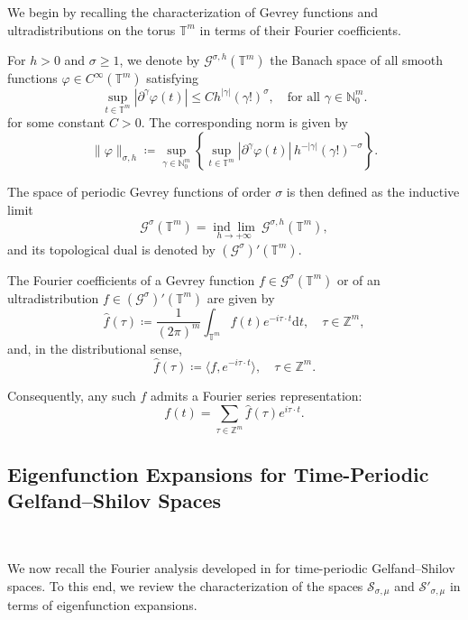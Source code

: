 \documentclass[12pt,reqno]{amsart}
\theoremstyle{definition}
\numberwithin{equation}{section}
\begin{document}
We begin by recalling the characterization of Gevrey functions and ultradistributions on the torus $\mathbb{T}^m$ in terms of their Fourier coefficients.

For $h > 0$ and $\sigma \geq 1$, we denote by $\mathcal{G}^{\sigma,h}(\mathbb{T}^m)$ the Banach space of all smooth functions $\varphi \in C^\infty(\mathbb{T}^m)$ satisfying
\begin{equation*}
	\sup_{t \in \mathbb{T}^m} |\partial^\gamma \varphi(t)| \leq C h^{|\gamma|} (\gamma!)^{\sigma}, \quad \text{for all } \gamma \in \mathbb{N}_0^m.
\end{equation*}
for some constant $C > 0$. The corresponding norm is given by
\begin{equation*}
	\|\varphi\|_{\sigma,h} \coloneqq \sup_{\gamma \in \mathbb{N}_0^m} \left\{ \sup_{t \in \mathbb{T}^m} |\partial^\gamma \varphi(t)| \, h^{-|\gamma|} (\gamma!)^{-\sigma} \right\}.
\end{equation*}

The space of periodic Gevrey functions of order $\sigma$ is then defined as the inductive limit
\[
\mathcal{G}^{\sigma}(\mathbb{T}^m) =  \underset{h\rightarrow +\infty}{\operatorname{ind} \lim} \ \mathcal{G}^{\sigma, h} (\mathbb{T}^m),
\]
and its topological dual is denoted by $(\mathcal{G}^{\sigma})'(\mathbb{T}^m)$.

The Fourier coefficients of a Gevrey function $f \in \mathcal{G}^{\sigma}(\mathbb{T}^m)$ or of an ultradistribution $f \in (\mathcal{G}^{\sigma})'(\mathbb{T}^m)$ are given by
\[
\widehat{f}(\tau) \coloneqq \frac{1}{(2\pi)^m} \int_{\mathbb{T}^m} f(t) e^{-i \tau \cdot t}  \mathrm{d}t, \quad \tau \in \mathbb{Z}^m,
\]
and, in the distributional sense,
\[
\widehat{f}(\tau) \coloneqq \langle f, e^{-i \tau \cdot t} \rangle, \quad \tau \in \mathbb{Z}^m.
\]

Consequently, any such $f$ admits a Fourier series representation:
\[
f(t) = \sum_{\tau \in \mathbb{Z}^m} \widehat{f}(\tau) e^{i \tau \cdot t}.
\]

\subsection{Eigenfunction Expansions for Time-Periodic Gelfand–Shilov Spaces} \

We now recall the Fourier analysis developed in
\cite{AviCap22,AviCapKir25} for time-periodic Gelfand--Shilov spaces.
 To this end, we review the characterization of the spaces $\mathcal{S}_{\sigma, \mu}$ and $\mathcal{S}'_{\sigma, \mu}$ in terms of eigenfunction expansions.
\end{document}
